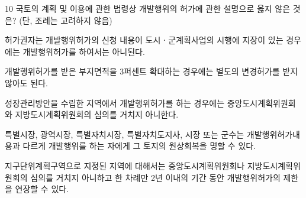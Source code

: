 \begin{question}{10}
국토의 계획 및 이용에 관한 법령상 개발행위의 허가에 관한 설명으로 옳지 않은 것은? (단, 조례는 고려하지 않음)
\begin{choices}
  \item 허가권자는 개발행위허가의 신청 내용이 도시ㆍ군계획사업의 시행에 지장이 있는 경우에는 개발행위허가를 하여서는 아니된다.
  \item 개발행위허가를 받은 부지면적을 3퍼센트 확대하는 경우에는 별도의 변경허가를 받지 않아도 된다.
  \item 성장관리방안을 수립한 지역에서 개발행위허가를 하는 경우에는 중앙도시계획위원회와 지방도시계획위원회의 심의를 거치지 아니한다.
  \item 특별시장, 광역시장, 특별자치시장, 특별자치도지사, 시장 또는 군수는 개발행위허가내용과 다르게 개발행위를 하는 자에게 그 토지의 원상회복을 명할 수 있다.
  \item 지구단위계획구역으로 지정된 지역에 대해서는 중앙도시계획위원회나 지방도시계획위원회의 심의를 거치지 아니하고 한 차례만 2년 이내의 기간 동안 개발행위허가의 제한을 연장할 수 있다.
\end{choices}
\end{question}
